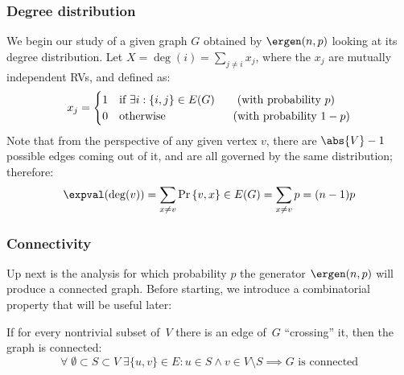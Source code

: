 \subsubsection{Degree distribution}\label{sec:gnp-degree}

We begin our study of a given graph $G$ obtained by $\ergen(n, p)$ looking at its degree distribution. Let $X = \deg(i) = \sum_{j \neq i} x_j$, where the $x_j$ are mutually independent RVs, and defined as:
\[
    x_j =
    \begin{cases}
        1 & \text{if } \exists i : \{i, j\} \in E(G) \text{\qquad (with probability } p)     \\
        0 & \text{otherwise}                         \text{\qquad \qquad \qquad (with probability } 1 - p) \\
    \end{cases}
\]
Note that from the perspective of any given vertex $v$, there are $\abs{V} - 1$ possible edges coming out of it, and are all governed by the same distribution; therefore:
\[
    \expval(\deg(v)) = \sum_{x \neq v} \Pr{\{v, x\} \in E(G)} = \sum_{x \neq v} p = (n - 1) p
\]


\subsubsection{Connectivity}

Up next is the analysis for which probability $p$ the generator $\ergen(n, p)$ will produce a connected graph. Before starting, we introduce a combinatorial property that will be useful later:

\begin{lem}\label{l:gnp-connectivity}
    If for every nontrivial subset of \,$V$ there is an edge of \,$G$ ``crossing'' it, then the graph is connected:
    \[
        \forall\; \emptyset \subset S \subset V \; \exists \{u,v\} \in E : u \in S \wedge v \in V \setminus S \implies G \text{ is connected}  
    \]
\end{lem}


